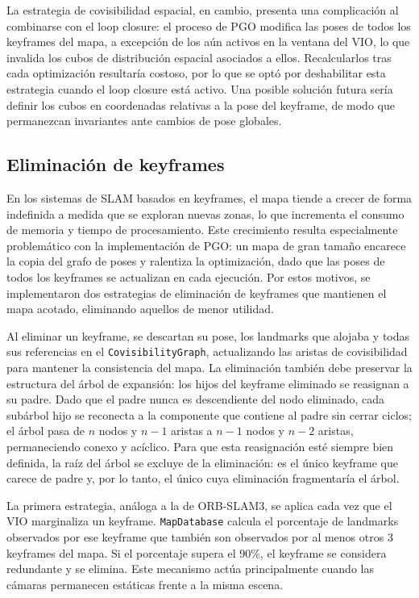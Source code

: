 La estrategia de covisibilidad espacial, en cambio, presenta una complicación al combinarse con el loop closure: el proceso de PGO modifica las poses de todos los keyframes del mapa, a excepción de los aún activos en la ventana del VIO, lo que invalida los cubos de distribución espacial asociados a ellos. Recalcularlos tras cada optimización resultaría costoso, por lo que se optó por deshabilitar esta estrategia cuando el loop closure está activo. Una posible solución futura sería definir los cubos en coordenadas relativas a la pose del keyframe, de modo que permanezcan invariantes ante cambios de pose globales.

\subsection{Eliminación de keyframes} \label{sec:culling}

En los sistemas de SLAM basados en keyframes, el mapa tiende a crecer de forma indefinida a medida que se exploran nuevas zonas, lo que incrementa el consumo de memoria y tiempo de procesamiento. Este crecimiento resulta especialmente problemático con la implementación de PGO: un mapa de gran tamaño encarece la copia del grafo de poses y ralentiza la optimización, dado que las poses de todos los keyframes se actualizan en cada ejecución. Por estos motivos, se implementaron dos estrategias de eliminación de keyframes que mantienen el mapa acotado, eliminando aquellos de menor utilidad.

Al eliminar un keyframe, se descartan su pose, los landmarks que alojaba y todas sus referencias en el \texttt{CovisibilityGraph}, actualizando las aristas de covisibilidad para mantener la consistencia del mapa. La eliminación también debe preservar la estructura del árbol de expansión: los hijos del keyframe eliminado se reasignan a su padre. Dado que el padre nunca es descendiente del nodo eliminado, cada subárbol hijo se reconecta a la componente que contiene al padre sin cerrar ciclos; el árbol pasa de $n$ nodos y $n-1$ aristas a $n-1$ nodos y $n-2$ aristas, permaneciendo conexo y acíclico. Para que esta reasignación esté siempre bien definida, la raíz del árbol se excluye de la eliminación: es el único keyframe que carece de padre y, por lo tanto, el único cuya eliminación fragmentaría el árbol.

La primera estrategia, análoga a la de ORB-SLAM3, se aplica cada vez que el VIO marginaliza un keyframe. \texttt{MapDatabase} calcula el porcentaje de landmarks observados por ese keyframe que también son observados por al menos otros 3 keyframes del mapa. Si el porcentaje supera el 90\%, el keyframe se considera redundante y se elimina. Este mecanismo actúa principalmente cuando las cámaras permanecen estáticas frente a la misma escena.


